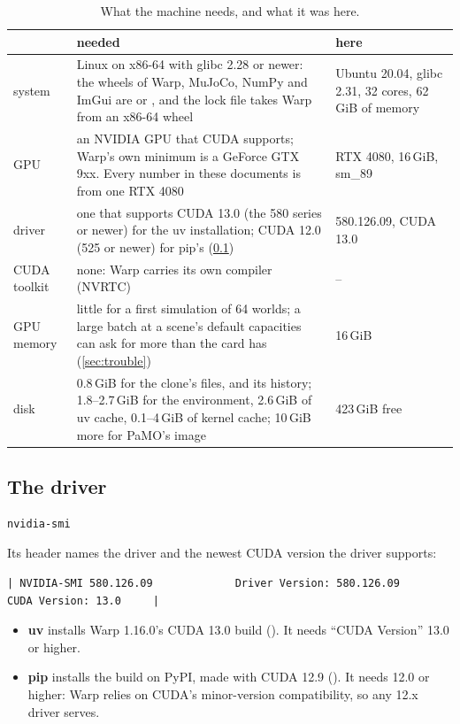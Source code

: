 \begin{table}[h]
\centering
\caption{What the machine needs, and what it was here.}
\label{tab:machine}
\small
\begin{tabularx}{\linewidth}{@{}L{22mm}YL{36mm}@{}}
\toprule
 & needed & here \\
\midrule
system & Linux on x86-64 with glibc 2.28 or newer: the wheels of Warp, MuJoCo, NumPy and ImGui are  or , and the lock file takes Warp from an x86-64 wheel & Ubuntu 20.04, glibc 2.31, 32 cores, 62\,GiB of memory \\
GPU & an NVIDIA GPU that CUDA supports; Warp's own minimum is a GeForce GTX 9xx. Every number in these documents is from one RTX 4080 & RTX 4080, 16\,GiB, sm\_89 \\
driver & one that supports CUDA 13.0 (the 580 series or newer) for the uv installation; CUDA 12.0 (525 or newer) for pip's (\cref{sec:driver}) & 580.126.09, CUDA 13.0 \\
CUDA toolkit & none: Warp carries its own compiler (NVRTC) & -- \\
GPU memory & little for a first simulation of 64 worlds; a large batch at a scene's default capacities can ask for more than the card has (\cref{sec:trouble}) & 16\,GiB \\
disk & 0.8\,GiB for the clone's files, and its history; 1.8--2.7\,GiB for the environment, 2.6\,GiB of uv cache, 0.1--4\,GiB of kernel cache; 10\,GiB more for PaMO's image & 423\,GiB free \\
\bottomrule
\end{tabularx}
\end{table}

\subsection{The driver}\label{sec:driver}

\begin{lstlisting}[language=bash]
nvidia-smi
\end{lstlisting}

Its header names the driver and the newest CUDA version the driver supports:

\begin{lstlisting}[language={}]
| NVIDIA-SMI 580.126.09             Driver Version: 580.126.09     CUDA Version: 13.0     |
\end{lstlisting}

\begin{itemize}
\item \textbf{uv} installs Warp 1.16.0's CUDA 13.0 build (). It needs ``CUDA Version'' 13.0 or higher.
\item \textbf{pip} installs the build on PyPI, made with CUDA 12.9 (). It needs 12.0 or higher: Warp relies on CUDA's minor-version compatibility, so any 12.x driver serves.
\end{itemize}

